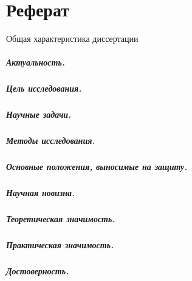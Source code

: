 \renewcommand{\figurename}{Рисунок}
\renewcommand{\tablename}{Таблица}
\renewcommand\thesubfigure{\asbuk{subfigure}}

\chapter*{Реферат}

\begin{center}
    Общая характеристика диссертации
\end{center}

\paragraph*{Актуальность.}

\paragraph*{Цель исследования.}
\paragraph*{Научные задачи.}

\paragraph*{Методы исследования.}


\paragraph*{Основные положения, выносимые на защиту.}

\paragraph*{Научная новизна.}

\paragraph*{Теоретическая значимость.}
\paragraph*{Практическая значимость.}
\paragraph*{Достоверность.}

